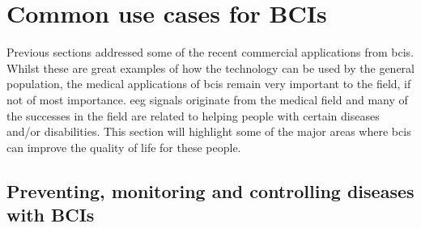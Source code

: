 
\section{Common use cases for BCIs}
\label{sec:bci_common_use_cases}

Previous sections addressed some of the recent commercial applications from \glspl{bci}.
Whilst these are great examples of how the technology can be used by the general population, the medical applications of \glspl{bci} remain very important to the field, if not of most importance.
\gls{eeg} signals originate from the medical field and many of the successes in the field are related to helping people with certain diseases and/or disabilities.
This section will highlight some of the major areas where \glspl{bci} can improve the quality of life for these people.


\subsection{Preventing, monitoring and controlling diseases with BCIs}
\label{subsec:bci_common_use_casesdiseases}


